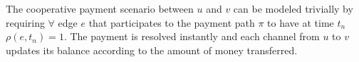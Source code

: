 	The cooperative payment scenario between $u$ and $v$ can be modeled trivially by requiring $\forall$ edge $e$ that participates to the payment path $\pi$ to have at time $t_n$ $\rho(e, t_n) = 1$. The payment is resolved instantly and each channel from $u$ to $v$ updates its balance according to the amount of money transferred. 
	
	

